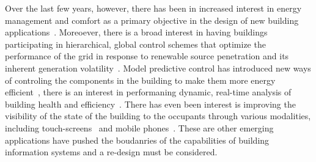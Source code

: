 Over the last few years, however, there has been in increased interest in energy management and comfort as a primary objective 
in the design of new building applications~\cite{}.  Moreoever, there is a broad interest in having buildings participating in hierarchical, 
global control schemes that optimize the performance of the grid in response to renewable source penetration and its inherent 
generation volatility~\cite{}.  Model predictive control has introduced new ways of controling the components in the building
to make them more energy efficient~\cite{mpc}, there is an interest in performaning dynamic, real-time analysis of building health
and efficiency~\cite{dynamicLeed}.  There has even been interest is improving the visibility of the state of the building to the 
occupants through various modalities, including touch-screens~\cite{} and mobile phones~\cite{andrew_lighting, buildsys1, buildsys2}.  
These are other emerging applications
have pushed the boudanries of the capabilities of building information systems and a re-design must be considered.







